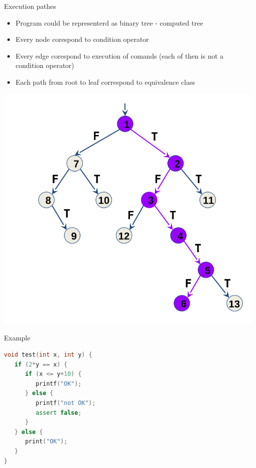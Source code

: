 \documentclass{beamer}
\begin{document}
\begin{frame}{Execution pathes}
\begin{minipage}{0.49\textwidth}
\begin{itemize}
\item Program could be representerd as binary tree - computed tree
\item Every node corespond to condition operator
\item Every edge corespond to execution of comands (each of then is not a condition operator)
\item Each path from root to leaf correspond to equivalence class
\end{itemize}
\end{minipage}
\begin{minipage}{0.49\textwidth}
\includegraphics[scale=0.2]{tree.png}
\end{minipage}
\end{frame}

\begin{frame}[fragile]{Example}
\begin{minipage}{0.49\textwidth}
\begin{lstlisting}[language=C++]
void test(int x, int y) {
   if (2*y == x) {
      if (x <= y+10) {
         printf("OK");
      } else {
         printf("not OK");
         assert false;
      }
   } else {
      print("OK");
   }
}
\end{lstlisting}
\end{minipage}
\end{frame}
\end{document}
